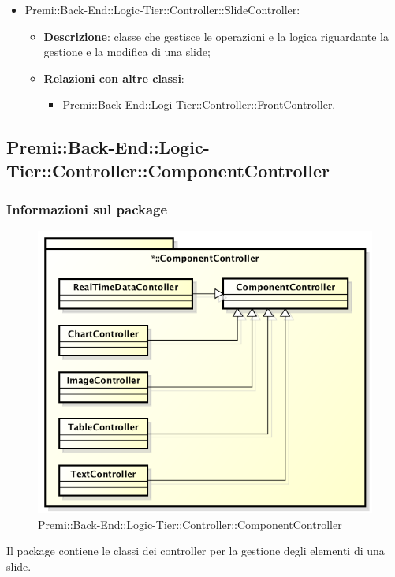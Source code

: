 \begin{itemize}
			\item Premi::Back-End::Logic-Tier::Controller::SlideController:
			\begin{itemize}
				\item \textbf{Descrizione}: classe che gestisce le operazioni e la logica riguardante la gestione e la modifica di una slide;
				\item \textbf{Relazioni con altre classi}:
				\begin{itemize}
					\item Premi::Back-End::Logi-Tier::Controller::FrontController.
				\end{itemize}
			\end{itemize}
		\end{itemize}
		
	
\subsection{Premi::Back-End::Logic-Tier::Controller::ComponentController}
	\subsubsection*{Informazioni sul package}
		\begin{figure}[h]
			\centering
			\includegraphics[width=0.9\linewidth]{img/back-end_logic-tier_controller_componentController}
			\caption[Premi::Back-End::Logic-Tier::Controller::ComponentController]{Premi::Back-End::Logic-Tier::Controller::ComponentController}
		\end{figure}
		Il package contiene le classi dei controller per la gestione degli elementi di una slide.
		
